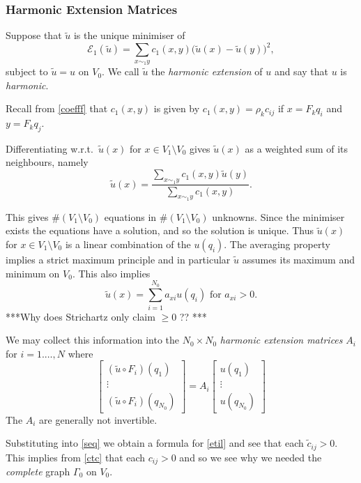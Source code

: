 \documentclass[a4paper]{amsart}
\theoremstyle{plain}
\theoremstyle{definition}
\theoremstyle{remark}
\begin{document}
\subsubsection{Harmonic Extension Matrices}  \label{sechem} 
Suppose that $  \widetilde{u} $ is the unique minimiser of 
\[
\mathcal{E} _1 (\widetilde{u}) = \sum_{x\sim_1 y } c_1(x,y) \big( \widetilde{u}(x) - \widetilde{u}(y) \big)^2,
\]
 subject to $ \widetilde{u} = u $ on $ V_0 $.  We call $  \widetilde{u}  $ the \emph{harmonic extension} of $ u $ and say that $ u $ is \emph{harmonic}.
 
 \bigskip Recall from \eqref{coefff} that $ c_1(x,y) $ is given by
$   c_1(x,y) = \rho_k c_{ij} $ if $   x = F_k q_i $ and $ y = F_k q_j $.
 
 Differentiating w.r.t.\ $ \widetilde{u}(x) $ 
  for $ x \in V_1 \setminus V_0 $ gives $ \widetilde{u}(x) $ as a weighted sum of its neighbours, namely
\[
\widetilde{u}(x) = \frac {\sum_{x\sim_1y}   c_1(x,y) \widetilde{u}(y) } { \sum_{x\sim_1y}   c_1(x,y) }.
\]

This gives $ \# (V_1\setminus V_0) $ equations in  $ \# (V_1\setminus V_0) $ unknowns. Since the minimiser exists the equations have a solution, and so the solution is unique.  Thus   $\widetilde{u}(x) $ for $ x \in V_1 \setminus V_0 $ is a linear combination of the $ u(q_i) $.  
The averaging property implies a strict maximum principle and in particular   $\widetilde{u} $ assumes its maximum and minimum on $ V_0 $.  This also implies  
\[
\widetilde{u}(x) = \sum_{i=1}^{N_0} a_{xi} u(q_i) \text{ for } a_{xi} > 0 .
\]
***Why does Strichartz only claim $ \geq 0 $ ?? ***

We may collect this information into the $ N_0 \times N_0 $ \emph{harmonic extension matrices} $ A_i $ for $ i=1.\dots, N $ where
\[
\begin{bmatrix} 
(\widetilde{u}\circ F_i)(q_1) \\ \vdots \\ (\widetilde{u}\circ F_i)(q_{N_0}) 
\end{bmatrix}
= A_i 
\begin{bmatrix} 
u(q_1) \\ \vdots \\ u(q_{N_0}) 
\end{bmatrix}
\]
The $ A_i $ are generally not invertible.

\bigskip Substituting into \eqref{seq} we obtain a formula for \eqref{etil} and see that each $ \widetilde{c}_{ij} > 0 $.  This implies from \eqref{ctc} that each $ c_{ij}>0 $ and so we see why we needed the \emph{complete} graph $ \Gamma_0 $ on $V_0 $.  
\end{document}
